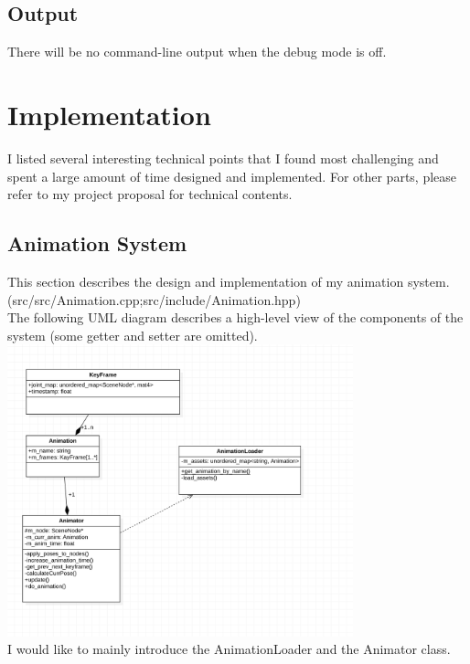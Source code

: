 \documentclass {article}
\begin{document}
    \subsection{Output}
    There will be no command-line output when the debug mode is off.
    \newpage
   
    



\newpage

\section{Implementation}
I listed several interesting technical points that I found most challenging and spent a large amount of time designed and implemented. For other parts, please refer to my 
project proposal for technical contents.
\subsection{Animation System}
This section describes the design and implementation of my animation system. (src/src/Animation.cpp;src/include/Animation.hpp) \\
The following UML diagram describes a high-level view of the components of the system (some getter and setter are omitted).\\
\includegraphics[width=100mm]{uml_animation.png} \\
I would like to mainly introduce the AnimationLoader and the Animator class.
\end{document}
